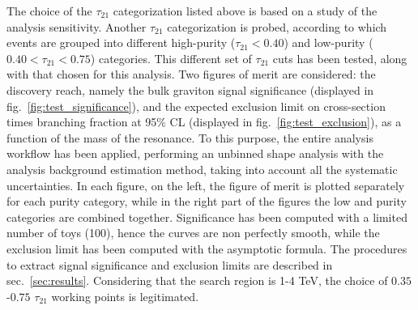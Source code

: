 
\noindent The choice of the $\tau_{21}$ categorization listed above is based on a study of the analysis sensitivity. Another $\tau_{21}$ categorization is probed, according to which events are grouped into different high-purity ($\tau_{21} < 0.40$) and low-purity ($0.40 < \tau_{21} < 0.75$) categories. This different set of $\tau_{21}$ cuts has been tested, along with that chosen for this analysis. Two figures of merit are considered: the discovery reach, namely the bulk graviton signal significance (displayed in fig.~\ref{fig:test_significance}), and the expected exclusion limit on cross-section times branching fraction at 95\% CL (displayed in fig.~\ref{fig:test_exclusion}), as a function of the mass of the resonance. To this purpose, the entire analysis workflow has been applied, performing an unbinned shape analysis with the analysis background estimation method, taking into account all the systematic uncertainties. In each figure, on the left, the figure of merit is plotted separately for each purity category, while in the right part of the figures the low and purity categories are combined together. Significance has been computed with a limited number of toys (100), hence the curves are non perfectly smooth, while the exclusion limit has been computed with the asymptotic formula. The procedures to extract signal significance and exclusion limits are described in sec.~\ref{sec:results}. Considering that the search region is 1-4 TeV, the choice of $0.35$-$0.75$ $\tau_{21}$ working points is legitimated.

